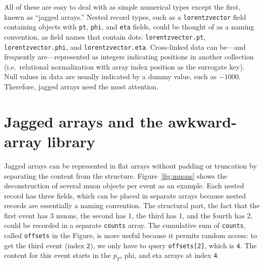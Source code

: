 \documentclass[a4paper]{jpconf}
\begin{document}
All of these are easy to deal with as simple numerical types except the first, known as ``jagged arrays.'' Nested record types, such as a {\tt lorentzvector} field containing objects with {\tt pt}, {\tt phi}, and {\tt eta} fields, could be thought of as a naming convention, as field names that contain dots: {\tt lorentzvector.pt}, {\tt lorentzvector.phi}, and {\tt lorentzvector.eta}. Cross-linked data can be---and frequently are---represented as integers indicating positions in another collection (i.e.\ relational normalization with array index position as the surrogate key). Null values in data are usually indicated by a dummy value, such as $-1000$. Therefore, jagged arrays need the most attention.

\section{Jagged arrays and the awkward-array library}

Jagged arrays can be represented in flat arrays without padding or truncation by separating the content from the structure. Figure~\ref{fig:muons} shows the deconstruction of several muon objects per event as an example. Each nested record has three fields, which can be placed in separate arrays because nested records are essentially a naming convention. The structural part, the fact that the first event has 3 muons, the second has 1, the third has 1, and the fourth has 2, could be recorded in a separate {\tt counts} array. The cumulative sum of {\tt counts}, called {\tt offsets} in the Figure, is more useful because it permits random access: to get the third event (index {\tt 2}), we only have to query {\tt offsets[2]}, which is {\tt 4}. The content for this event starts in the $p_T$, phi, and eta arrays at index {\tt 4}.
\end{document}
